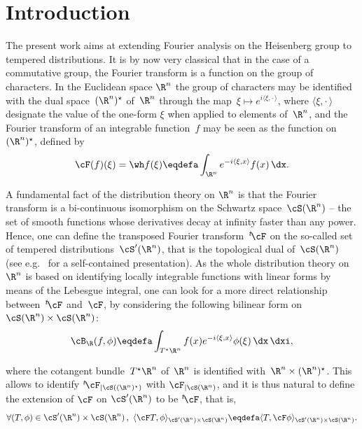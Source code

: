 \section{Introduction}

The present work aims at extending Fourier analysis on the Heisenberg group to tempered distributions. It is by now very classical that in the case of a commutative group, the Fourier transform is a function on the group of characters. In the Euclidean space $\R^n$ the group of characters may be identified with the dual space~$(\R^n)^\star$ of~$\R^n$ through the map~$\xi \mapsto e^{i\langle \xi,{\cdot\,}\rangle}$, where $\langle \xi,{\cdot\,}\rangle$ designate the value of the one-form $\xi$ when applied to elements of~$\R^n$, and the Fourier transform of an integrable function~$f$ may be seen as the function on $(\R^n)^\star$, defined by
\begin{equation}\label{definFourierclassic}
\cF (f) (\xi) = \wh f(\xi)\eqdefa \int_{\R^n} e^{-i\langle \xi,x\rangle } f(x)\, \dx.
\end{equation}

A fundamental fact of the distribution theory on $\R^n$ is that the Fourier transform is a bi-continuous isomorphism on the Schwartz space~$\cS(\R^n)$ -- the set of smooth functions whose derivatives decay at infinity faster than any power. Hence, one can define the transposed Fourier transform~${}^t\!\cF$ on the so-called set of tempered distributions~$\cS'(\R^n)$, that is the topological dual of~$\cS(\R^n)$ (see e.g.~\cite{rudin, S} for a self-contained presentation). As the whole distribution theory on~$\R^n$ is based on identifying locally integrable functions with linear forms by means of the Lebesgue integral, one can look for a more direct relationship between~${}^t\!\cF$ and~$\cF$, by considering the following bilinear form on~$\cS(\R^n)\times\cS(\R^n)$:
\begin{equation}\label{definFourierRbilin}
\cB_\R (f,\phi)\eqdefa \int_{T^\star \R^n} f(x) e^{-i\langle \xi,x\rangle} \phi(\xi) \,\dx \,\dxi,
\end{equation}

where the cotangent bundle~$T^\star \R^n$ of~$\R^n$ is identified with~$\R^n\times (\R^n)^\star$. This allows to identify ${}^t\!\cF_{|\cS((\R^n)^\star)}$ with $\cF_{|\cS(\R^n)}$, and it is thus natural to define the extension of $\cF$ on $\cS'(\R^n)$ to be ${}^t\!\cF$, that is,
\begin{equation}\label{definFourierS'}
\forall (T,\phi) \in \cS'(\R^n)\times\cS(\R^n)\,,\ \langle \cF T,\phi\rangle_{\cS'(\R^n)\times\cS(\R^n)}\eqdefa \langle T,\cF \phi\rangle_{\cS'(\R^n)\times\cS(\R^n)}.
\end{equation}

